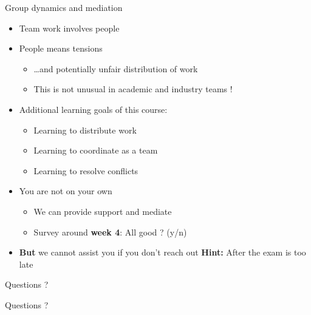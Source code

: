 \begin{frame}{Group dynamics and mediation}
    \begin{itemize}
        \item Team work involves people
        \item People means tensions
            \begin{itemize}
                \vspace{-0.3em}
                \item \ldots and potentially unfair distribution of work
                \vspace{-0.3em}
                \item This is not unusual in academic and industry teams !
            \end{itemize}
        \vspace{1.0em}
        \item Additional \alert{learning goals of this course}:
            \begin{itemize}
                \item Learning to distribute work
                \item Learning to coordinate as a team
                \item Learning to resolve conflicts
            \end{itemize}
        \vspace{1.0em}
            \item \alert{You are not on your own}
                \begin{itemize}
                \vspace{-0.3em}
                \item We can provide support and mediate
                \vspace{-0.3em}
                \item Survey around \textbf{week 4}: \alert{All good ? (y/n)}
                \end{itemize}
            \vspace{0.5em}
            \item \textbf{But} we cannot assist you if you don't reach out
                \linebreak
                \textbf{Hint:}  After the exam is too late
    \end{itemize}
\end{frame}

\begin{frame}{Questions ?}
    \begin{center}
        \huge{Questions ?}
    \end{center}
\end{frame}
